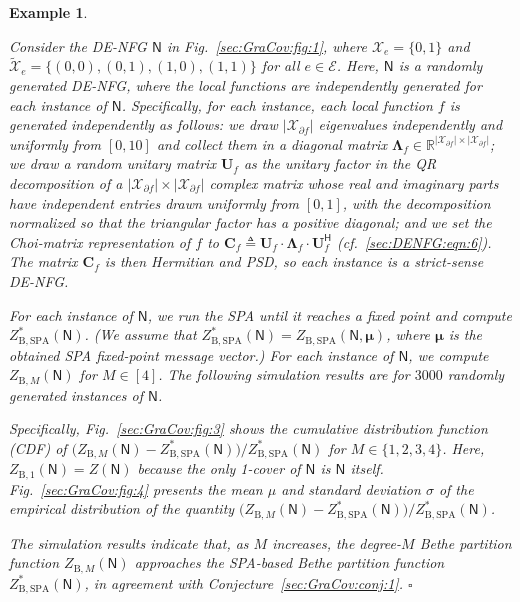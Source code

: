 \documentclass[journal]{IEEEtran}
\newcommand{\add}[1]{{\color{black}#1}}
\newtheorem{example}[theorem]{Example}
\newcommand{\manualendsymbol}[1]{%
  \leavevmode\unskip\penalty9999\hbox{}\nobreak\hfill
  \quad\hbox{#1}}
\newcommand{\eexample}{\manualendsymbol{\ensuremath{\square}}}
\newcommand{\vect}[1]{ \bm{#1} }
\newcommand{\set}[1]{\mathcal{#1}}
\newcommand{\setEfull}{ \mathcal{E} }
\newcommand{\setpf}{ \partial f }
\newcommand{\sR}{\mathbb{R}}
\newcommand{\Herm}{\mathsf{H}}
\newcommand{\vmu}{ \vect{ \mu } }
\newcommand{\graphN}{ \mathsf{N} }
\newcommand{\defeq}{ \triangleq }
\newcommand{\ZBSPA}{ Z_{\mathrm{B,SPA}} }
\newcommand{\ZBM}{ Z_{\mathrm{B},M} }
\newcommand{\tset}[1]{\tilde{\mathcal{#1}}}
\newcommand{\matr}[1]{\vect{#1}}
\begin{document}
\begin{example}
  \label{sec:GraCov:exp:1}

  Consider the DE-NFG $\graphN$ in Fig.~\ref{sec:GraCov:fig:1}, where
  $\set{X}_e = \{ 0, 1 \}$ and $ \tset{X}_e  = \{ (0,0),(0,1),(1,0), (1,1) \} $
  for all $e \in \setEfull$. Here, $\graphN$ is a
  randomly generated DE-NFG, where the local functions are independently
  generated for each instance of $\graphN$. \add{Specifically, for each instance, each local function $f$ is generated independently as follows: we draw $|\set{X}_{\setpf}|$ eigenvalues independently and uniformly from $[0,10]$ and collect them in a diagonal matrix $\matr{\Lambda}_f \in \sR^{|\set{X}_{\setpf}| \times |\set{X}_{\setpf}|}$; we draw a random unitary matrix $\matr{U}_f$ as the unitary factor in the QR decomposition of a $|\set{X}_{\setpf}| \times |\set{X}_{\setpf}|$ complex matrix whose real and imaginary parts have independent entries drawn uniformly from $[0,1]$, with the decomposition normalized so that the triangular factor has a positive diagonal; and we set the Choi-matrix representation of $f$ to $\matr{C}_f \defeq \matr{U}_f \cdot \matr{\Lambda}_f \cdot \matr{U}_f^{\Herm}$ (cf.~\eqref{sec:DENFG:eqn:6}). The matrix $\matr{C}_f$ is then Hermitian and PSD, so each instance is a strict-sense DE-NFG.}

  For each instance of $\graphN$, we run the SPA until it reaches
  a fixed point and compute $\ZBSPA^{*}(\graphN)$. (We assume that
  $\ZBSPA^{*}(\graphN) = \ZBSPA(\graphN,\vmu)$, where $\vmu$ is the
  obtained SPA fixed-point message vector.) For
  each instance of $\graphN$, we compute $\ZBM(\graphN)$ for $ M \in [4]$. The following simulation results are for $3000$ randomly
  generated instances of $\graphN$.

  Specifically, Fig.~\ref{sec:GraCov:fig:3} shows the cumulative distribution
  function (CDF) of
  $\bigl( \ZBM(\graphN) \! - \! \ZBSPA^{*}(\graphN) \bigr) /
    \ZBSPA^{*}(\graphN)$ for $ M \in \{1,2,3,4\} $. \add{Here,
    $ Z_{\mathrm{B},1}(\graphN) = Z(\graphN) $ because the only 1-cover of $\graphN$ is $\graphN$ itself.}
  Fig.~\ref{sec:GraCov:fig:4} presents the mean $\mu$
  and standard deviation $\sigma$ of the empirical distribution of the quantity
  $\bigl( \ZBM(\graphN) \! - \! \ZBSPA^{*}(\graphN) \bigr) /
    \ZBSPA^{*}(\graphN)$.

  The simulation results indicate that, as $M$ increases, the degree-$M$ Bethe
  partition function $\ZBM(\graphN)$ approaches the SPA-based Bethe partition function $\ZBSPA^{*}(\graphN)$\add{, in agreement with Conjecture~\ref{sec:GraCov:conj:1}}.
  \eexample
\end{example}
\end{document}
